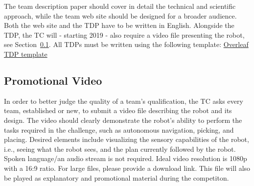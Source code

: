 The team description paper should cover in detail the technical and scientific approach, while the team web site should be designed for a broader audience. Both the web site and the TDP have to be written in English. Alongside the TDP, the TC will - starting 2019 - also require a video file presenting the robot, see Section~\ref{ssec:promotional_video}. All TDPs must be written using the following template: \href{https://www.overleaf.com/latex/templates/springer-lecture-notes-in-computer-science/kzwwpvhwnvfj#.WtR5Hy5ua71}{Overleaf TDP template} 

\subsection{Promotional Video}
\label{ssec:promotional_video}
In order to better judge the quality of a team's qualification, the TC asks every team, established or new, to submit a video file describing the robot and its design. The video should clearly demonstrate the robot's ability to perform the tasks required in the challenge, such as autonomous navigation, picking, and placing. Desired elements include visualizing the sensory capabilities of the robot, i.e., seeing what the robot sees, and the plan currently followed by the robot. Spoken language/an audio stream is not required. Ideal video resolution is 1080p with a 16:9 ratio. For large files, please provide a download link.
This file will also be played as explanatory and promotional material during the competiton.
